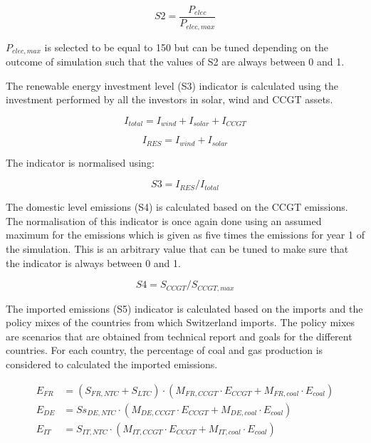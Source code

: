 \documentclass[12pt]{article}
\begin{document}
\begin{equation}
S2 = \frac{P_{elec}}{P_{elec, max}}
\end{equation}

$P_{elec, max}$ is selected to be equal to 150 but can be tuned depending on the outcome of simulation such that the values of S2 are always between 0 and 1.

The renewable energy investment level (S3) indicator is calculated using the investment performed by all the investors in solar, wind and CCGT assets.

\begin{equation}
I_{total} = I_{wind} + I_{solar} + I_{CCGT}
\end{equation}

\begin{equation}
I_{RES} = I_{wind} + I_{solar}
\end{equation}

The indicator is normalised using:

\begin{equation}
S3 = I_{RES} / I_{total}
\end{equation}

The domestic level emissions (S4) is calculated based on the CCGT emissions. The normalisation of this indicator is once again done using an assumed maximum for the emissions which is given as five times the emissions for year 1 of the simulation. This is an arbitrary value that can be tuned to make sure that the indicator is always between 0 and 1.

\begin{equation}
S4 = S_{CCGT} / S_{CCGT, max}
\end{equation}

The imported emissions (S5) indicator is calculated based on the imports and the policy mixes of the countries from which Switzerland imports. The policy mixes are scenarios that are obtained from technical report and goals for the different countries. For each country, the percentage of coal and gas production is considered to calculated the imported emissions.

\begin{subequations}
\begin{align}
        E_{FR} & = (S_{FR, NTC} + S_{LTC}) \cdot (M_{FR, CCGT} \cdot E_{CCGT} + M_{FR, coal} \cdot E_{coal}) \\
         E_{DE} & = Ss_{DE, NTC} \cdot (M_{DE, CCGT} \cdot E_{CCGT} + M_{DE, coal} \cdot E_{coal}) \\
         E_{IT} & = S_{IT, NTC} \cdot (M_{IT, CCGT} \cdot E_{CCGT} + M_{IT, coal} \cdot E_{coal})
         \end{align}
\end{subequations}
\end{document}
